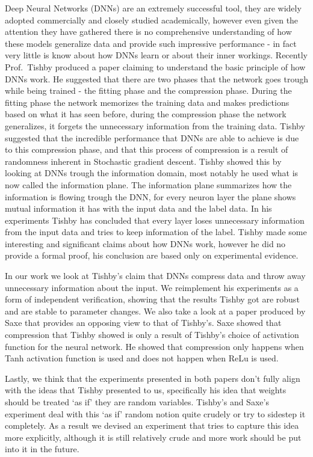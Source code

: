\documentclass[dissertation.tex]{subfiles}
\begin{document}
Deep Neural Networks (DNNs) are an extremely successful tool, they are widely
adopted commercially and closely studied academically, however even given the
attention they have gathered there is no comprehensive understanding of how
these models generalize data and provide such impressive performance - in fact
very little is know about how DNNs learn or about their inner workings. Recently
Prof.\ Tishby produced a paper claiming to understand the basic principle of how
DNNs work. He suggested that there are two phases that the network goes trough
while being trained - the fitting phase and the compression phase. During the
fitting phase the network memorizes the training data and makes predictions
based on what it has seen before, during the compression phase the network
generalizes, it forgets the unnecessary information from the training data.
Tishby suggested that the incredible performance that DNNs are able to achieve
is due to this compression phase, and that this process of compression is a
result of randomness inherent in Stochastic gradient descent. Tishby showed this
by looking at DNNs trough the information domain, most notably he used what is
now called the information plane. The information plane summarizes how the
information is flowing trough the DNN, for every neuron layer the plane shows
mutual information it has with the input data and the label data. In his
experiments Tishby has concluded that every layer loses unnecessary information
from the input data and tries to keep information of the label.
Tishby made some interesting and significant claims about how DNNs work, however
he did no provide a formal proof, his conclusion are based only on experimental
evidence. 

In our work we look at Tishby's claim that DNNs compress data and throw away
unnecessary information about the input. We reimplement his experiments as a
form of independent verification, showing that the results Tishby got are robust
and are stable to parameter changes. We also take a look at a paper produced by
Saxe that provides an opposing view to that of Tishby's. Saxe showed that
compression that Tishby showed is only a result of Tishby's choice of
activation function for the neural network. He showed that compression only
happens when Tanh activation function is used and does not happen when ReLu is
used.

Lastly, we think that the experiments presented in both papers don't fully align
with the ideas that Tishby presented to us, specifically his idea that weights
should be treated `as if' they are random variables. Tishby's and Saxe's
experiment deal with this `as if' random notion quite crudely or try to sidestep
it completely. As a result we devised an experiment that tries to capture this
idea more explicitly, although it is still relatively crude and more work should
be put into it in the future.
\end{document}
